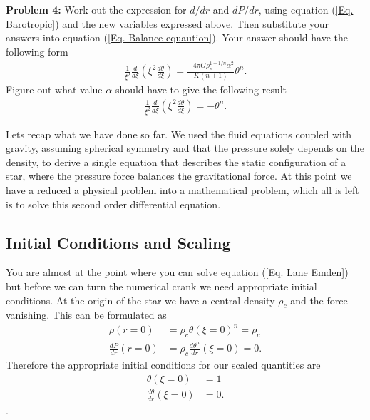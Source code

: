 \documentclass{article}
\begin{document}
\bigskip
\noindent
\textbf{Problem 4:} Work out the expression for $d/dr$ and $dP/dr$, using equation (\ref{Eq. Barotropic}) and the new variables expressed above. Then substitute your answers into equation (\ref{Eq. Balance equaution}). Your answer should have the following form
\begin{align*}
\frac{1}{\xi^2}\frac{d}{d\xi}\left(\xi^2\frac{d\theta}{d\xi}\right) = \frac{-4\pi G \rho_c^{1-1/n} \alpha^2}{K(n+1)} \theta^n.
\end{align*}
Figure out what value $\alpha$ should have to give the following result
\begin{align}
\label{Eq. Lane Emden}
\boxed{\frac{1}{\xi^2}\frac{d}{d\xi}\left(\xi^2\frac{d\theta}{d\xi}\right) = - \theta^n.}
\end{align}

Lets recap what we have done so far. We used the fluid equations coupled with gravity, assuming spherical symmetry and that the pressure solely depends on the density, to derive a single equation that describes the static configuration of a star, where the pressure force balances the gravitational force. At this point we have a reduced a physical problem into a mathematical problem, which all is left is to solve this second order differential equation. 

\subsection{Initial Conditions and Scaling}
You are almost at the point where you can solve equation (\ref{Eq. Lane Emden}) but before we can turn the numerical crank we need appropriate initial conditions. At the origin of the star we have a central density $\rho_c$ and the force vanishing. This can be formulated as
\begin{align*}
\rho(r=0) &=\rho_c\theta(\xi=0)^n = \rho_c\\
\frac{dP}{dr}(r=0) & =\rho_c\frac{d\theta^n}{dr}(\xi=0) = 0.
\end{align*}
Therefore the appropriate initial conditions for our scaled quantities are
\begin{align}
\label{Eq. Initial Conditions 1}
\theta(\xi=0) &= 1\\
\label{Eq. Initial Conditions 2}
\frac{d\theta}{dr}(\xi=0) &=0.
\end{align}.
\end{document}
